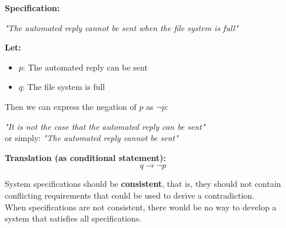 \begin{tcolorbox}[title=Example 1: Express a specification using logical connectives.]
\textbf{Specification:}  
\begin{center}
\textit{"The automated reply cannot be sent when the file system is full"}
\end{center}
\textbf{Let:}
\begin{itemize}
  \item $p$: The automated reply can be sent
  \item $q$: The file system is full
\end{itemize}
Then we can express the negation of $p$ as $\neg p:$
\begin{center}
\textit{"It is not the case that the automated reply can be sent"} \\ or simply: \textit{"The automated reply cannot be sent"}
\end{center}{}

\vspace{0.5em}

\textbf{Translation (as conditional statement):}
\[
q \rightarrow \neg p
\]
\end{tcolorbox}
\begin{tcolorbox}[colback=white, colframe=gray!60, title=Remark 1]
System specifications should be \textbf{consistent}, that is, they should not contain conflicting requirements
that could be used to derive a contradiction. \\ When specifications are not consistent,
there would be no way to develop a system that satisfies all specifications.
\end{tcolorbox}

